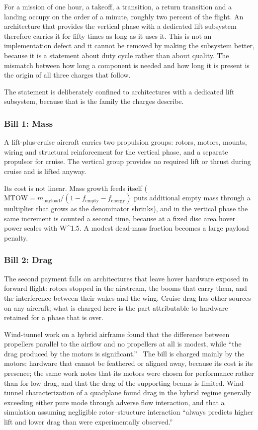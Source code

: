 \documentclass[journal]{new-aiaa}
\begin{document}
For a mission of one hour, a takeoff, a transition, a return transition and a landing occupy on the order of a minute, roughly two percent of the flight. An architecture that provides the vertical phase with a dedicated lift subsystem therefore carries it for fifty times as long as it uses it. This is not an implementation defect and it cannot be removed by making the subsystem better, because it is a statement about duty cycle rather than about quality. The mismatch between how long a component is needed and how long it is present is the origin of all three charges that follow.

The statement is deliberately confined to architectures with a dedicated lift subsystem, because that is the family the charges describe.

\subsubsection{Bill 1: Mass}

A lift-plus-cruise aircraft carries two propulsion groups: rotors, motors, mounts, wiring and structural reinforcement for the vertical phase, and a separate propulsor for cruise. The vertical group provides no required lift or thrust during cruise and is lifted anyway.

Its cost is not linear. Mass growth feeds itself ($\mathrm{MTOW} = m_\mathrm{payload}/(1 - f_\mathrm{empty} - f_\mathrm{energy})$ puts additional empty mass through a multiplier that grows as the denominator shrinks), and in the vertical phase the same increment is counted a second time, because at a fixed disc area hover power scales with W\^{}1.5. A modest dead-mass fraction becomes a large payload penalty.

\subsubsection{Bill 2: Drag}

The second payment falls on architectures that leave hover hardware exposed in forward flight: rotors stopped in the airstream, the booms that carry them, and the interference between their wakes and the wing. Cruise drag has other sources on any aircraft; what is charged here is the part attributable to hardware retained for a phase that is over.

Wind-tunnel work on a hybrid airframe found that the difference between propellers parallel to the airflow and no propellers at all is modest, while ``the drag produced by the motors is significant.''~\cite{r14} The bill is charged mainly by the motors: hardware that cannot be feathered or aligned away, because its cost is its presence; the same work notes that its motors were chosen for performance rather than for low drag, and that the drag of the supporting beams is limited. Wind-tunnel characterization of a quadplane found drag in the hybrid regime generally exceeding either pure mode through adverse flow interaction, and that a simulation assuming negligible rotor--structure interaction ``always predicts higher lift and lower drag than were experimentally observed.''~\cite{r15}
\end{document}
